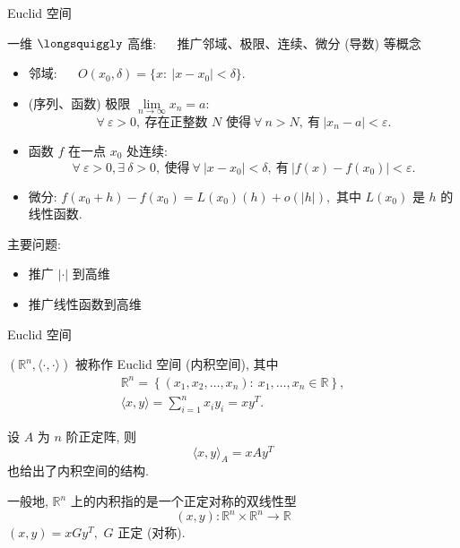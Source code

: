 
\begin{frame}{Euclid 空间}

一维 $\longsquiggly$ 高维: ~~ 推广邻域、极限、连续、微分 (导数) 等概念

\pause
\vspace{1em}

\begin{itemize}
\item 邻域: ~~ $O(x_0, \delta) = \{ x: ~ \lvert x - x_0 \rvert < \delta \}.$
\pause
\item (序列、函数) 极限 $\lim\limits_{n\to\infty} x_n = a$:
\[\forall ~ \varepsilon > 0, ~ \text{存在正整数 $N$ 使得} ~ \forall~n > N, ~ \text{有} ~ \lvert x_n - a \rvert < \varepsilon.\]
\pause
\item 函数 $f$ 在一点 $x_0$ 处连续:
\[\forall ~ \varepsilon > 0, \exists ~ \delta > 0, ~ \text{使得} ~ \forall~\lvert x - x_0 \rvert < \delta, ~ \text{有} ~ \lvert f(x) - f(x_0) \rvert < \varepsilon.\]
\pause
\item 微分: $f(x_0 + h) - f(x_0) = L(x_0)(h) + o(\lvert h \rvert),$ 其中 $L(x_0)$ 是 $h$ 的线性函数.
\end{itemize}

\pause
\vspace{1em}

主要问题:

\begin{itemize}[<+->]
\item 推广 $\lvert \cdot \rvert$ 到高维
\item 推广线性函数到高维
\end{itemize}

\end{frame}


\begin{frame}{Euclid 空间}

\begin{Def}[Euclid 空间]
$(\mathbb{R}^n, \langle \cdot, \cdot \rangle)$ 被称作 Euclid 空间 (内积空间), 其中
\begin{gather*}
\mathbb{R}^n = \left\{ (x_1, x_2, \dots, x_n) : ~ x_1, \dots, x_n \in \mathbb{R} \right\}, \\
\langle x, y \rangle = \sum\limits_{i=1}^n x_i y_i = x y^T.
\end{gather*}
\end{Def}

\pause

设 $A$ 为 $n$ 阶正定阵, 则
\[\langle x, y \rangle_A = xAy^T\]
也给出了内积空间的结构.

\pause
\vspace{0.5em}

一般地, $\mathbb{R}^n$ 上的内积指的是一个正定对称的双线性型
\[(x, y) : \mathbb{R}^n \times \mathbb{R}^n \longrightarrow \mathbb{R}\]
$(x, y) = xGy^T,$ $G$ 正定 (对称).

\end{frame}

